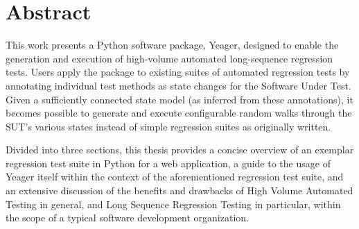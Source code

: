 \doublespacing
\chapter*{Abstract}
\abstract{}
 This work presents a Python software package, Yeager, designed to enable the generation and execution of high-volume automated long-sequence regression tests. Users apply the package to existing suites of automated regression tests by annotating individual test methods as state changes for the Software Under Test. Given a sufficiently connected state model (as inferred from these annotations), it becomes possible to generate and execute configurable random walks through the SUT's various states instead of simple regression suites as originally written.

Divided into three sections, this thesis provides a concise overview of an exemplar regression test suite in Python for a web application, a guide to the usage of Yeager itself within the context of the aforementioned regression test suite, and an extensive discussion of the benefits and drawbacks of High Volume Automated Testing in general, and Long Sequence Regression Testing in particular, within the scope of a typical software development organization.